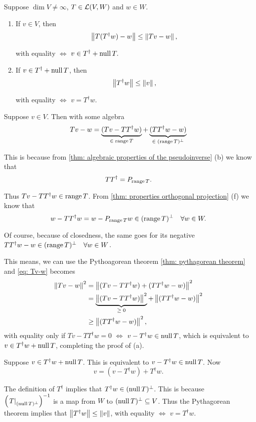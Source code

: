 \begin{thm}
  Suppose $\dim V \neq \infty$, $T \in \mathcal{L}(V,W)$ and $w\in W$.
  \begin{enumerate}[label=\textbf{(\alph*)}]
    \item If $v \in V$, then
    \[
      \left \lVert T(T^\dagger w)-w \right \rVert \leq \left \lVert Tv -w \right \rVert,
    \]

    with equality $\iff$ $v \in T^\dagger + \operatorname{null} T.$

    \item If $v \in T^\dagger + \operatorname{null} T$, then
    \[
      \left \lVert T^\dagger w \right \rVert \leq \left \lVert v \right \rVert,
    \]

    with equality $\iff$ $v=T^\dagger w$.
  \end{enumerate}
\end{thm}
\begin{prf}
  Suppose $v\in V$. Then with some algebra
  \begin{equation}
    \label{eq: Tv-w}
    Tv -w = \underbrace{(Tv-TT^\dagger w)}_{\in \; \operatorname{range} T} + \underbrace{(TT^\dagger w -w)}_{\in \; (\operatorname{range} T)^\bot}
  \end{equation}

  This is because from \ref{thm: algebraic properties of the pseudoinverse} (b) we know that
  \[
    TT^\dagger = P_{\operatorname{range} T}.
  \]

  Thus $Tv-TT^\dagger w\in \operatorname{range} T$. From \ref{thm: properties orthogonal projection} (f) we know that
  \[
    w-TT^\dagger w = w-P_{\operatorname{range} T} w \in (\operatorname{range} T)^\bot \quad \forall w \in W.
  \]

  Of course, because of closedness, the same goes for its negative $TT^\dagger w-w \in (\operatorname{range} T)^\bot \quad \forall w \in W$.

  This means, we can use the Pythoagorean theorem \ref{thm: pythagorean theorem} and \eqref{eq: Tv-w} becomes
  \[
    \begin{aligned}
      \left \lVert Tv-w \right \rVert^2 &= \left \lVert (Tv-TT^\dagger w) + (TT^\dagger w -w) \right \rVert^2 \\
      &= \underbrace{\left \lVert (Tv-TT^\dagger w) \right \rVert^2}_{\geq \; 0} + \left \lVert (TT^\dagger w -w) \right \rVert^2 \\
      &\geq \left \lVert (TT^\dagger w -w) \right \rVert^2,
    \end{aligned}
  \]
  with equality only if $Tv - TT^\dagger w=0$ $\iff$ $v-T^\dagger w \in \operatorname{null} T$, which is equivalent to $v\in T^\dagger w + \operatorname{null} T$, completing the proof of (a).

   Suppose $v \in T^\dagger w + \operatorname{null} T$. This is equivalent to $v-T^\dagger w \in \operatorname{null} T$. Now
  \[
    v = (v-T^\dagger w) + T^\dagger w.
  \]

  The definition of $T^\dagger$ implies that $T^\dagger w \in (\operatorname{null} T)^\bot$. This is because $\left( \left. T \right|_{(\operatorname{null} T)^\bot} \right)^{-1}$ is a map from $W$ to $(\operatorname{null} T)^\bot \subseteq V$. Thus the Pythagorean theorem implies that $\left \lVert  T^\dagger w \right \rVert \leq \left \lVert v \right \rVert$, with equality $\iff$ $v=T^\dagger w$.
\end{prf}